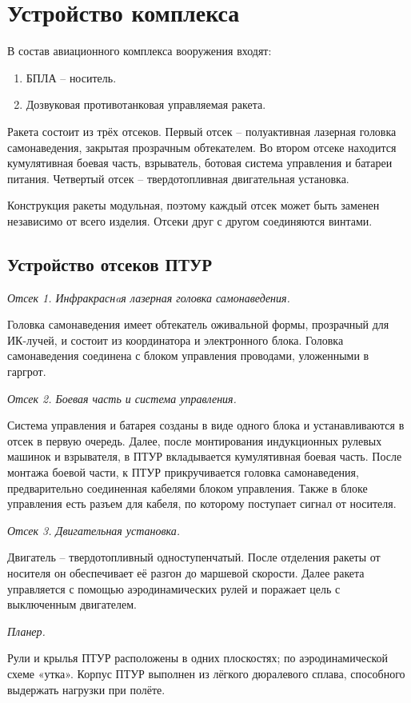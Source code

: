 \clearpage
\section{Устройство комплекса}
В состав авиационного комплекса вооружения входят:
\begin{enumerate}[1.]
	\item БПЛА – носитель.
	\item Дозвуковая противотанковая управляемая ракета.
\end{enumerate}

Ракета состоит из трёх отсеков. Первый отсек – полуактивная лазерная головка самонаведения, закрытая прозрачным обтекателем. Во втором отсеке находится кумулятивная боевая часть, взрыватель, ботовая система управления и батареи питания. Четвертый отсек – твердотопливная двигательная установка.

Конструкция ракеты модульная, поэтому каждый отсек может быть заменен независимо от всего изделия. Отсеки друг с другом соединяются винтами.
\subsection{Устройство отсеков ПТУР}
\emph{Отсек 1. Инфракраснaя лазерная головка самонаведения.}

Головка самонаведения имеет обтекатель оживальной формы, прозрачный для ИК-лучей, и состоит из координатора и электронного блока. Головка самонаведения соединена с блоком управления проводами, уложенными в гаргрот.

\emph{Отсек 2. Боевая часть и система управления.}

Система управления и батарея созданы в виде одного блока и устанавливаются в отсек в первую очередь. Далее, после монтирования индукционных рулевых машинок и взрывателя, в ПТУР вкладывается кумулятивная боевая часть. После монтажа боевой части, к ПТУР прикручивается головка самонаведения, предварительно соединенная кабелями блоком управления. Также в блоке управления есть разъем для кабеля, по которому поступает сигнал от носителя.

\emph{Отсек 3. Двигательная установка.}

Двигатель – твердотопливный одноступенчатый. После отделения ракеты от носителя он обеспечивает её разгон до маршевой скорости. Далее ракета управляется с помощью аэродинамических рулей и поражает цель с выключенным двигателем.

\emph{Планер.}

Рули и крылья ПТУР расположены в одних плоскостях; по аэродинамической схеме «утка». Корпус ПТУР выполнен из лёгкого дюралевого сплава, способного выдержать нагрузки при полёте.

